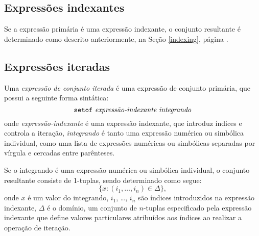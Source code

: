 \documentclass[11pt, brazil]{report}
\begin{document}
\subsection{Expressões indexantes}

Se a expressão primária é uma expressão indexante, o conjunto resultante
é determinado como descrito anteriormente, na Seção \ref{indexing}, página
\pageref{indexing}.


\newpage

\subsection{Expressões iteradas}

Uma {\it expressão de conjunto iterada} é uma expressão de conjunto
primária, que possui a seguinte forma sintática:
$$\mbox{{\tt setof} {\it expressão-indexante} {\it integrando}}$$
onde {\it expressão-indexante} é uma expressão indexante, que
introduz índices e controla a iteração, {\it integrando} é
tanto uma expressão numérica ou simbólica individual, como uma
lista de expressões numéricas ou simbólicas separadas por vírgula
e cercadas entre parênteses.


Se o integrando é uma expressão numérica ou simbólica individual, o
conjunto resultante consiste de 1-tuplas, sendo determinado como segue:
$$\{x:(i_1,\dots,i_n)\in\Delta\},$$
\noindent onde $x$ é um valor do integrando, $i_1$, \dots, $i_n$
são índices introduzidos na expressão indexante, $\Delta$ é
o domínio, um conjunto de $n$-tuplas especificado pela expressão
indexante que define valores particulares atribuídos aos índices ao
realizar a operação de iteração.

\end{document}

